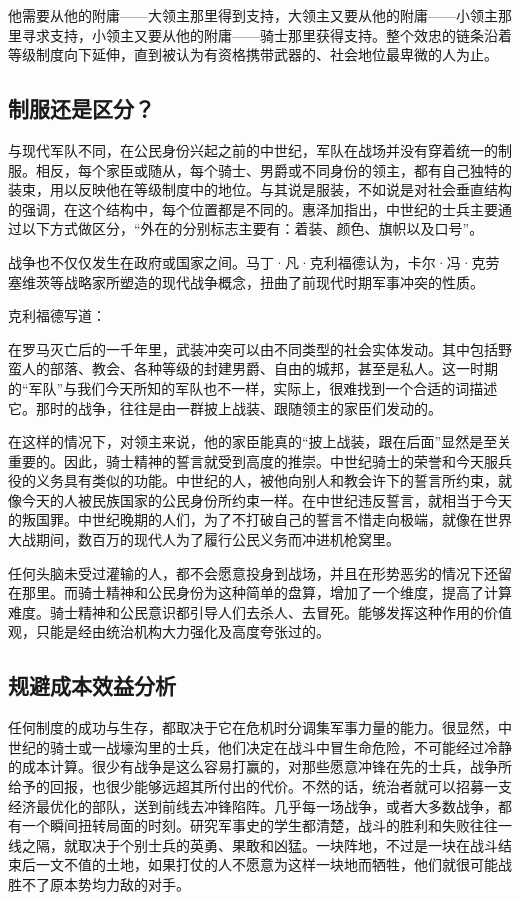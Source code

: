 他需要从他的附庸——大领主那里得到支持，大领主又要从他的附庸——小领主那里寻求支持，小领主又要从他的附庸——骑士那里获得支持。整个效忠的链条沿着等级制度向下延伸，直到被认为有资格携带武器的、社会地位最卑微的人为止。

\subsection{制服还是区分？}
与现代军队不同，在公民身份兴起之前的中世纪，军队在战场并没有穿着统一的制服。相反，每个家臣或随从，每个骑士、男爵或不同身份的领主，都有自己独特的装束，用以反映他在等级制度中的地位。与其说是服装，不如说是对社会垂直结构的强调，在这个结构中，每个位置都是不同的。惠泽加指出，中世纪的士兵主要通过以下方式做区分，“外在的分别标志主要有：着装、颜色、旗帜以及口号”。

战争也不仅仅发生在政府或国家之间。马丁·凡·克利福德认为，卡尔·冯·克劳塞维茨等战略家所塑造的现代战争概念，扭曲了前现代时期军事冲突的性质。

克利福德写道：

\begin{tcolorbox}
\kaishu 在罗马灭亡后的一千年里，武装冲突可以由不同类型的社会实体发动。其中包括野蛮人的部落、教会、各种等级的封建男爵、自由的城邦，甚至是私人。这一时期的“军队”与我们今天所知的军队也不一样，实际上，很难找到一个合适的词描述它。那时的战争，往往是由一群披上战装、跟随领主的家臣们发动的。
\end{tcolorbox}

在这样的情况下，对领主来说，他的家臣能真的“披上战装，跟在后面”显然是至关重要的。因此，骑士精神的誓言就受到高度的推崇。中世纪骑士的荣誉和今天服兵役的义务具有类似的功能。中世纪的人，被他向别人和教会许下的誓言所约束，就像今天的人被民族国家的公民身份所约束一样。在中世纪违反誓言，就相当于今天的叛国罪。中世纪晚期的人们，为了不打破自己的誓言不惜走向极端，就像在世界大战期间，数百万的现代人为了履行公民义务而冲进机枪窝里。

任何头脑未受过灌输的人，都不会愿意投身到战场，并且在形势恶劣的情况下还留在那里。而骑士精神和公民身份为这种简单的盘算，增加了一个维度，提高了计算难度。骑士精神和公民意识都引导人们去杀人、去冒死。能够发挥这种作用的价值观，只能是经由统治机构大力强化及高度夸张过的。

\subsection{规避成本效益分析}
任何制度的成功与生存，都取决于它在危机时分调集军事力量的能力。很显然，中世纪的骑士或一战壕沟里的士兵，他们决定在战斗中冒生命危险，不可能经过冷静的成本计算。很少有战争是这么容易打赢的，对那些愿意冲锋在先的士兵，战争所给予的回报，也很少能够远超其所付出的代价。不然的话，统治者就可以招募一支经济最优化的部队，送到前线去冲锋陷阵。几乎每一场战争，或者大多数战争，都有一个瞬间扭转局面的时刻。研究军事史的学生都清楚，战斗的胜利和失败往往一线之隔，就取决于个别士兵的英勇、果敢和凶猛。一块阵地，不过是一块在战斗结束后一文不值的土地，如果打仗的人不愿意为这样一块地而牺牲，他们就很可能战胜不了原本势均力敌的对手。

